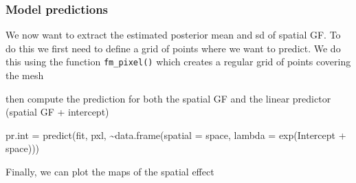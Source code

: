 \documentclass[
  letterpaper,
  DIV=11,
  numbers=noendperiod]{scrartcl}
\newenvironment{Shaded}{\begin{snugshade}}{\end{snugshade}}
\newcommand{\AttributeTok}[1]{\textcolor[rgb]{0.40,0.45,0.13}{#1}}
\newcommand{\DecValTok}[1]{\textcolor[rgb]{0.68,0.00,0.00}{#1}}
\newcommand{\FunctionTok}[1]{\textcolor[rgb]{0.28,0.35,0.67}{#1}}
\newcommand{\NormalTok}[1]{\textcolor[rgb]{0.00,0.23,0.31}{#1}}
\newcommand{\OtherTok}[1]{\textcolor[rgb]{0.00,0.23,0.31}{#1}}
\newcommand{\SpecialCharTok}[1]{\textcolor[rgb]{0.37,0.37,0.37}{#1}}
\newcommand{\StringTok}[1]{\textcolor[rgb]{0.13,0.47,0.30}{#1}}
\begin{document}
\subsubsection{Model predictions}\label{model-predictions}

We now want to extract the estimated posterior mean and sd of spatial
GF. To do this we first need to define a grid of points where we want to
predict. We do this using the function \texttt{fm\_pixel()} which
creates a regular grid of points covering the mesh

\begin{Shaded}
\end{Shaded}

then compute the prediction for both the spatial GF and the linear
predictor (spatial GF + intercept)

\begin{Shaded}
\begin{Highlighting}[]
\NormalTok{pr.int }\OtherTok{=} \FunctionTok{predict}\NormalTok{(fit, pxl, }\SpecialCharTok{\textasciitilde{}}\FunctionTok{data.frame}\NormalTok{(}\AttributeTok{spatial =}\NormalTok{ space,}
                                      \AttributeTok{lambda =} \FunctionTok{exp}\NormalTok{(Intercept }\SpecialCharTok{+}\NormalTok{ space)))}
\end{Highlighting}
\end{Shaded}

Finally, we can plot the maps of the spatial effect

\begin{Shaded}
\end{Shaded}
\end{document}
